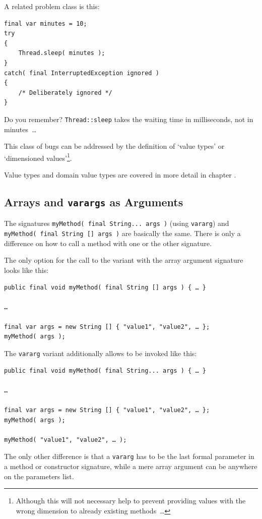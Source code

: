 A related problem class is this:
\begin{lstlisting}
final var minutes = 10;
try
{
    Thread.sleep( minutes );
}
catch( final InterruptedException ignored )
{
    /* Deliberately ignored */
}
\end{lstlisting}
Do you remember? \lstinline|Thread::sleep| takes the waiting time in milliseconds, not in minutes~…

This class of bugs can be addressed by the definition of ‘value types’ or ‘dimensioned values’\footnote{Although this will not necessary help to prevent providing values with the wrong dimension to already existing methods~…}. 

Value types and domain value types are covered in more detail in chapter .


\subsection{Arrays and \lstinline|varargs| as Arguments}
The signatures \lstinline|myMethod( final String... args )| (using \verb#vararg#) and \lstinline|myMethod( final String [] args )| are basically the same. There is only a difference on how to call a method with one or the other signature.

The only option for the call to the variant with the array argument signature looks like this:
\begin{lstlisting}
public final void myMethod( final String [] args ) { … }

…

final var args = new String [] { "value1", "value2", … };
myMethod( args ); 
\end{lstlisting}

The \verb#vararg# variant additionally allows to be invoked like this:
\begin{lstlisting}
public final void myMethod( final String... args ) { … }

…

final var args = new String [] { "value1", "value2", … };
myMethod( args ); 

myMethod( "value1", "value2", … );
\end{lstlisting}

The only other difference is that a \verb#vararg# has to be the last formal parameter in a method or constructor signature, while a mere array argument can be anywhere on the parameters list.

